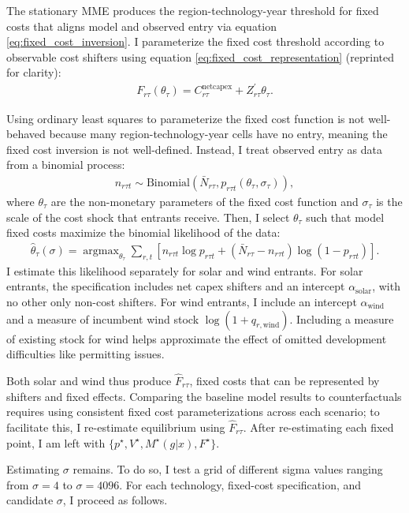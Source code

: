 \documentclass[12pt]{article}
\DeclareMathOperator*{\argmax}{argmax}
\begin{document}
The stationary MME produces the region-technology-year threshold for fixed costs that aligns model and observed entry via equation \ref{eq:fixed_cost_inversion}. I parameterize the fixed cost threshold according to observable cost shifters using equation \ref{eq:fixed_cost_representation} (reprinted for clarity):
\begin{align*}
    F_{r\tau}(\theta_\tau) = C^{\mathrm{net capex}}_{r\tau} + Z^\prime_{r\tau}\theta_\tau.
\end{align*} 

Using ordinary least squares to parameterize the fixed cost function is not well-behaved because many region-technology-year cells have no entry, meaning the fixed cost inversion is not well-defined. Instead, I treat observed entry as data from a binomial process:
\begin{align}
    n_{r\tau t} \sim \mathrm{Binomial}(\bar{N}_{r\tau},p_{r\tau t}(\theta_\tau, \sigma_\tau)),
\end{align}
where $\theta_\tau$ are the non-monetary parameters of the fixed cost function and $\sigma_\tau$ is the scale of the cost shock that entrants receive. Then, I select $\theta_\tau$ such that model fixed costs maximize the binomial likelihood of the data:
\begin{align}
    \hat{\theta}_\tau(\sigma) = \argmax_{\theta_\tau} \sum_{r,t} [n_{r\tau t}\log p_{r\tau t} + (\bar{N}_{r\tau} - n_{r\tau t}) \log (1 - p_{r\tau t})].
\end{align}
I estimate this likelihood separately for solar and wind entrants. For solar entrants, the specification includes net capex shifters and an intercept $\alpha_{\mathrm{solar}}$, with no other only non-cost shifters. For wind entrants, I include an intercept $\alpha_{\mathrm{wind}}$ and a measure of incumbent wind stock $\log(1 + q_{r,\mathrm{wind}})$. Including a measure of existing stock for wind helps approximate the effect of omitted development difficulties like permitting issues. 

Both solar and wind thus produce $\hat{F}_{r\tau}$, fixed costs that can be represented by shifters and fixed effects. Comparing the baseline model results to counterfactuals requires using consistent fixed cost parameterizations across each scenario; to facilitate this, I re-estimate equilibrium using $\hat{F}_{r\tau}$. After re-estimating each fixed point, I am left with $\{p^\star, V^\star, M^\star(g|x),F^\star\}$.

Estimating $\sigma$ remains. To do so, I test a grid of different sigma values ranging from $\sigma=4$ to $\sigma=4096$. For each technology, fixed-cost specification, and candidate $\sigma$, I proceed as follows. 
\end{document}
